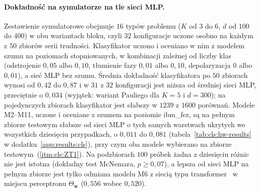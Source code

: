 \paragraph{Dokładność na symulatorze na tle sieci MLP.}
Zestawienie symulatorowe obejmuje $16$ typów problemu ($K$ od $3$ do $6$, $d$ od $100$ do $400$) w obu wariantach bloku, czyli $32$ konfiguracje uczone osobno na każdym z $50$ zbiorów serii trudności.
Klasyfikator uczono i oceniano w nim z modelem szumu na poziomach stopniowanych, w kombinacji zależnej od liczby klas (odstrojenie $0{,}05$ albo $0{,}10$, tłumienie fazy $0{,}01$ albo $0{,}10$, depolaryzacja $0$ albo $0{,}01$), a sieć MLP bez szumu.
Średnia dokładność klasyfikatora po $50$ zbiorach wynosi od $0{,}42$ do $0{,}87$ i w $31$ z $32$ konfiguracji jest niższa od średniej sieci MLP, przeciętnie o $0{,}034$ (wyjątek: wariant Pauliego dla $K=5$ i $d=300$); na pojedynczych zbiorach klasyfikator jest słabszy w $1239$ z $1600$ porównań.
Modele M2--M11, uczone i oceniane z szumem na poziomie ibm\_fez, są na pełnym zbiorze testowym słabsze od sieci MLP o tych samych warstwach ukrytych we wszystkich dziesięciu przypadkach, o $0{,}011$ do $0{,}081$ (tabela~\ref{tab:cls:hw-results} w dodatku~\ref{app:results:cls}), przy czym oba modele wybierano na zbiorze testowym~(\ref{itm:cls:ZT1}).
Na podzbiorach $100$ próbek żadna z dziesięciu różnic nie jest istotna (dokładny test McNemara, $p\geq 0{,}07$), a lepsza od sieci MLP na pełnym zbiorze jest tylko odmiana modelu M6 z siecią typu transformer~\cite{vaswani2017attention} w miejscu perceptronu $\Theta_{\mathbf{w}}$ ($0{,}556$ wobec $0{,}520$).


